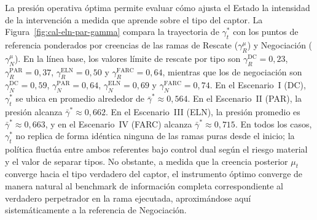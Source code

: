 \documentclass[review,authoryear,12pt]{elsarticle}
\theoremstyle{plain}
\theoremstyle{definition}
\newcommand{\1}{\mathbf{1}}
\begin{document}
La presión operativa óptima permite evaluar cómo ajusta el Estado la intensidad de la intervención a medida que aprende sobre el tipo del captor. La Figura~\ref{fig:cal-eln-par-gamma} compara la trayectoria de $\gamma_t^\ast$ con los puntos de referencia ponderados por creencias de las ramas de Rescate ($\gamma_R^\mu$) y Negociación ($\gamma_N^\mu$). En la línea base, los valores límite de rescate por tipo son $\gamma_R^{\mathrm{DC}}=0{,}23$, $\gamma_R^{\mathrm{PAR}}=0{,}37$, $\gamma_R^{\mathrm{ELN}}=0{,}50$ y $\gamma_R^{\mathrm{FARC}}=0{,}64$, mientras que los de negociación son $\gamma_N^{\mathrm{DC}}=0{,}59$, $\gamma_N^{\mathrm{PAR}}=0{,}64$, $\gamma_N^{\mathrm{ELN}}=0{,}69$ y $\gamma_N^{\mathrm{FARC}}=0{,}74$. En el Escenario~I (DC), $\gamma_t^\ast$ se ubica en promedio alrededor de $\bar\gamma^\ast\approx 0{,}564$. En el Escenario~II (PAR), la presión alcanza $\bar\gamma^\ast\approx 0{,}662$. En el Escenario~III (ELN), la presión promedio es $\bar\gamma^\ast\approx 0{,}663$, y en el Escenario~IV (FARC) alcanza $\bar\gamma^\ast\approx 0{,}715$. En todos los casos, $\gamma_t^\ast$ no replica de forma idéntica ninguna de las ramas puras desde el inicio; la política fluctúa entre ambos referentes bajo control dual según el riesgo material y el valor de separar tipos. No obstante, a medida que la creencia posterior $\mu_t$ converge hacia el tipo verdadero del captor, el instrumento óptimo converge de manera natural al benchmark de información completa correspondiente al verdadero perpetrador en la rama ejecutada, aproximándose aquí sistemáticamente a la referencia de Negociación.
\end{document}
